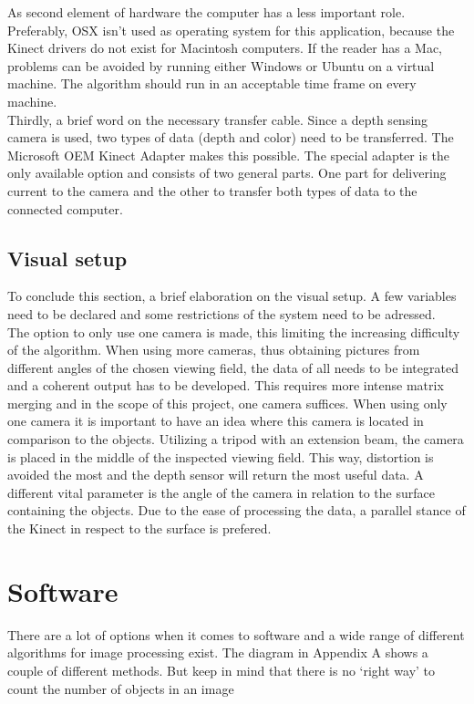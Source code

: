 \documentclass{article}
\begin{document}
\noindent As second element of hardware the computer has a less important role. Preferably, OSX isn't used as operating system for this application, because the Kinect drivers do not exist for Macintosh computers. If the reader has a Mac, problems can be avoided by running either Windows or Ubuntu on a virtual machine. The algorithm should run in an acceptable time frame on every machine.\\ Thirdly, a brief word on the necessary transfer cable. Since a depth sensing camera is used, two types of data (depth and color) need to be transferred. The Microsoft OEM Kinect Adapter makes this possible. The special adapter is the only available option and consists of two general parts. One part for delivering current to the camera and the other to transfer both types of data to the connected computer.\\

\subsection{Visual setup}
\noindent To conclude this section, a brief elaboration on the visual setup. A few variables need to be declared and some restrictions of the system need to be adressed.\\ The option to only use one camera is made, this limiting the increasing difficulty of the algorithm. When using more cameras, thus obtaining pictures from different angles of the chosen viewing field, the data of all needs to be integrated and a coherent output has to be developed. This requires more intense matrix merging and in the scope of this project, one camera suffices. When using only one camera it is important to have an idea where this camera is located in comparison to the objects. Utilizing a tripod with an extension beam, the camera is placed in the middle of the inspected viewing field. This way, distortion is avoided the most and the depth sensor will return the most useful data. A different vital parameter is the angle of the camera in relation to the surface containing the objects. Due to the ease of processing the data, a parallel stance of the Kinect in respect to the surface is prefered. 

\section{Software}
There are a lot of options when it comes to software and a wide range of different algorithms for image processing exist. The diagram in Appendix A shows a couple of different methods. But keep in mind that there is no ‘right ­way’ to count the number of objects in an image
\end{document}
